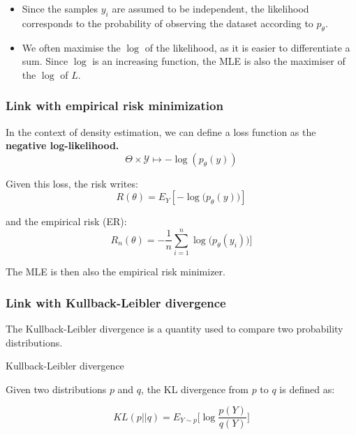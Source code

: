 \documentclass[
10pt, %
a4paper, %
oneside, %
headinclude,footinclude, %
BCOR5mm, %
]{scrartcl}
\begin{document}
\begin{remark}
    \begin{itemize}
        \item Since the samples $y_i$ are assumed to be independent, the likelihood corresponds to the probability of observing the dataset according to $p_{\theta}$.
	\item We often maximise the $\log$ of the likelihood, as it is easier to differentiate a sum. Since $\log$ is an increasing function, the MLE is also the maximiser of the $\log$ of $L$.
    \end{itemize}
\end{remark}

\subsubsection{\large\color{Periwinkle}Link with empirical risk minimization}

In the context of density estimation, we can define a loss function as the \textbf{{negative log-likelihood.}}
\begin{equation*}
    \Theta\times \mathcal{Y} \mapsto - \log(p_{\theta}(y))
\end{equation*}

Given this loss, the risk writes:
\begin{equation*}
    R(\theta) = E_Y[-\log\big(p_{\theta}(y)\big)]
\end{equation*}

and the empirical risk (ER):
\begin{equation*}
    R_n(\theta) =-\frac{1}{n} \sum^{n}_{i=1} \log\big(p_{\theta}(y_i)\big)]
\end{equation*}

The MLE is then also the empirical risk minimizer.

\subsubsection{\large\color{Periwinkle}Link with Kullback-Leibler divergence}

The Kullback-Leibler divergence is a quantity used to compare two probability distributions.

\begin{definition}{Kullback-Leibler divergence}

    Given two distributions $p$ and $q$, the KL divergence from $p$ to $q$ is defined as:

    \begin{equation*}
	KL(p||q) = E_{Y\sim p} \Big[\log \frac{p(Y)}{q(Y)} \Big]
    \end{equation*}
\end{definition}
\end{document}
